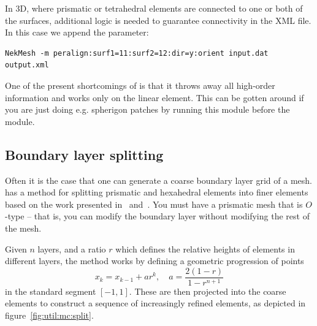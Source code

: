 In 3D, where prismatic or tetrahedral elements are connected to one or both of
the surfaces, additional logic is needed to guarantee connectivity in the XML
file. In this case we append the  parameter:
%
\begin{lstlisting}[style=BashInputStyle]
NekMesh -m peralign:surf1=11:surf2=12:dir=y:orient input.dat output.xml
\end{lstlisting}

\begin{notebox}
  One of the present shortcomings of  is that it throws away all
  high-order information and works only on the linear element. This can be
  gotten around if you are just doing e.g. spherigon patches by running this
   module before the  module.
\end{notebox}

\subsection{Boundary layer splitting}

Often it is the case that one can generate a coarse boundary layer grid of a
mesh. \nm has a method for splitting prismatic and hexahedral elements into
finer elements based on the work presented in~\cite{MoHaPeSh14}
and~\cite{MoHaPeSh14b}. You must have a prismatic mesh that is $O$-type -- that
is, you can modify the boundary layer without modifying the rest of the mesh.

Given $n$ layers, and a ratio $r$ which defines the relative heights of elements
in different layers, the method works by defining a geometric progression of
points
\[
x_k = x_{k-1} + ar^k, \quad a = \frac{2(1-r)}{1 - r^{n+1}}
\]
in the standard segment $[-1,1]$. These are then projected into the coarse
elements to construct a sequence of increasingly refined elements, as depicted
in figure~\ref{fig:util:mc:split}.

